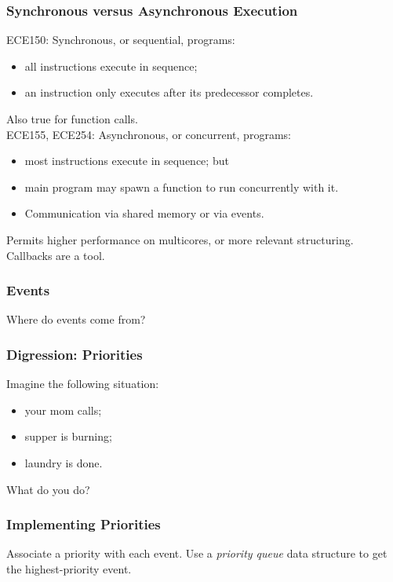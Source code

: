 \documentclass[aspectratio=169]{beamer}
\begin{document}
\begin{frame}
\frametitle{Synchronous versus Asynchronous Execution}

ECE150: Synchronous, or sequential, programs:
\begin{itemize}
\item all instructions execute in sequence;
\item an instruction only executes after its predecessor completes.
\end{itemize}
Also true for function calls.\\[1em]

ECE155, ECE254: Asynchronous, or concurrent, programs:
\begin{itemize}
\item most instructions execute in sequence; but
\item main program may spawn a function to run concurrently with it.
\item Communication via shared memory or via events.
\end{itemize}
Permits higher performance on multicores, or more relevant structuring.
Callbacks are a tool.

\end{frame}

\begin{frame}
\frametitle{Events}
\Large
Where do events come from?
\end{frame}

\begin{frame}
\frametitle{Digression: Priorities}
Imagine the following situation:
\begin{itemize}
\item your mom calls;
\item supper is burning;
\item laundry is done.
\end{itemize}
What do you do?
\end{frame}

\begin{frame}
\frametitle{Implementing Priorities}
Associate a priority with each event.
Use a \emph{priority queue} data structure to get the highest-priority event.

\begin{center}

\end{center}
\end{frame}
\end{document}
